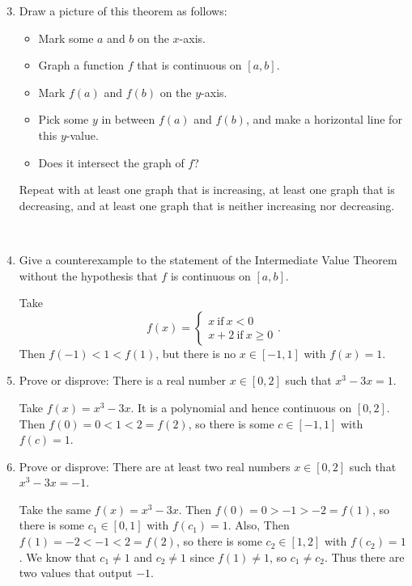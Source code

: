 \documentclass[12pt]{amsart}
\numberwithin{equation}{section}
\theoremstyle{plain} %
\theoremstyle{definition}
\theoremstyle{remark}
\begin{document}
\begin{enumerate}\setcounter{enumi}{2}
\item Draw a picture of this theorem as follows: 
\begin{itemize}
\item Mark some $a$ and $b$ on the $x$-axis. 
\item Graph a function $f$ that is continuous on $[a,b]$.
\item Mark $f(a)$ and $f(b)$ on the $y$-axis.
\item Pick some $y$ in between  $f(a)$ and $f(b)$, and make a horizontal line for this $y$-value.
\item Does it intersect the graph of $f$?
\end{itemize}
Repeat with at least one graph that is increasing, at least one graph that is decreasing, and at least one graph that is neither increasing nor decreasing.

\

\item  Give a counterexample to the statement of the Intermediate Value Theorem without the hypothesis that $f$ is continuous on $[a,b]$.

\begin{framed}
Take \[f(x) = \begin{cases} x \ \text{if} \ x<0 \\ x+2 \ \text{if} \ x\geq 0 \end{cases}.\]
Then $f(-1) < 1 < f(1)$, but there is no $x\in [-1,1]$ with $f(x) = 1$.
\end{framed}

\item Prove or disprove: There is a real number $x\in [0,2]$ such that $x^3 - 3x = 1$.

\begin{framed}
Take $f(x) = x^3 - 3x$. It is a polynomial and hence continuous on $[0,2]$.
Then $f(0) = 0 < 1 < 2= f(2)$, so there is some $c\in [-1,1]$ with $f(c) = 1$.
\end{framed}

\item Prove or disprove: There are at least two real numbers $x\in [0,2]$ such that $x^3 - 3x = -1$.

\begin{framed}
Take the same $f(x) = x^3 - 3x$.
Then $f(0) = 0 > -1 > -2 = f(1)$, so there is some $c_1\in [0,1]$ with $f(c_1) = 1$. Also,
Then $f(1) = -2 < -1 < 2 = f(2)$, so there is some $c_2\in [1,2]$ with $f(c_2) = 1$. We know that $c_1\neq 1$ and $c_2 \neq 1$ since $f(1)\neq 1$, so $c_1\neq c_2$. Thus there are two values that output $-1$.
\end{framed}


\end{enumerate}
\end{document}
